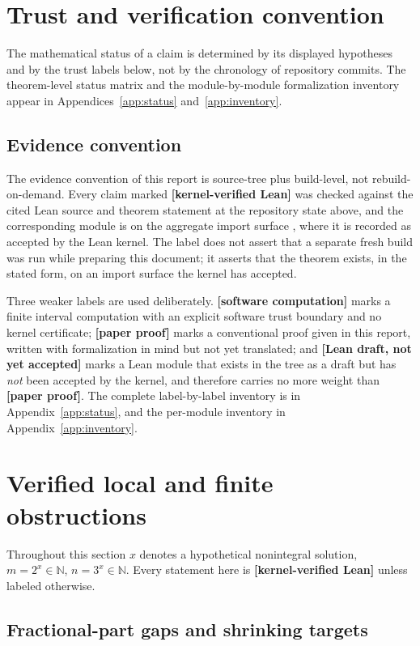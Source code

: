 \documentclass[11pt,oneside]{article}
\theoremstyle{definition}
\theoremstyle{remark}
\newcommand{\N}{\mathbb N}
\newcommand{\lean}[1]{\texttt{\detokenize{#1}}}
\newcommand{\statuslean}{\textcolor{leanblue}{\textbf{[kernel-verified Lean]}}}
\newcommand{\statusnew}{\textcolor{newgreen}{\textbf{[paper proof]}}}
\newcommand{\statuscomp}{\textcolor{computeviolet}{\textbf{[software computation]}}}
\newcommand{\statusdraft}{\textcolor{computeviolet}{\textbf{[Lean draft, not yet accepted]}}}
\begin{document}
\section{Trust and verification convention}
\label{sec:trust-convention}

The mathematical status of a claim is determined by its displayed hypotheses and by the
trust labels below, not by the chronology of repository commits.  The theorem-level status
matrix and the module-by-module formalization inventory appear in
Appendices~\ref{app:status} and~\ref{app:inventory}.

\subsection{Evidence convention}
\label{pr:evidence-convention}

The evidence convention of this report is source-tree plus build-level, not
rebuild-on-demand.  Every claim marked \statuslean{} was checked against the cited Lean
source and theorem statement at the repository state above, and the corresponding module is
on the aggregate import surface \lean{ExponentialIdentities.lean}, where it is recorded as
accepted by the Lean kernel.  The label does not assert that a separate fresh build was run
while preparing this document; it asserts that the theorem exists, in the stated form, on an
import surface the kernel has accepted.

Three weaker labels are used deliberately.  \statuscomp{} marks a finite interval
computation with an explicit software trust boundary and no kernel certificate;
\statusnew{} marks a conventional proof given in this report, written with formalization in
mind but not yet translated; and \statusdraft{} marks a Lean module that exists in the tree
as a draft but has \emph{not} been accepted by the kernel, and therefore carries no more
weight than \statusnew.  The complete label-by-label inventory is in
Appendix~\ref{app:status}, and the per-module inventory in Appendix~\ref{app:inventory}.
\section{Verified local and finite obstructions}
\label{sec:corpus}

Throughout this section $x$ denotes a hypothetical nonintegral solution, $m=2^x\in\N$,
$n=3^x\in\N$.  Every statement here is \statuslean{} unless labeled otherwise.

\subsection{Fractional-part gaps and shrinking targets}
\label{co:gaps}
\end{document}
